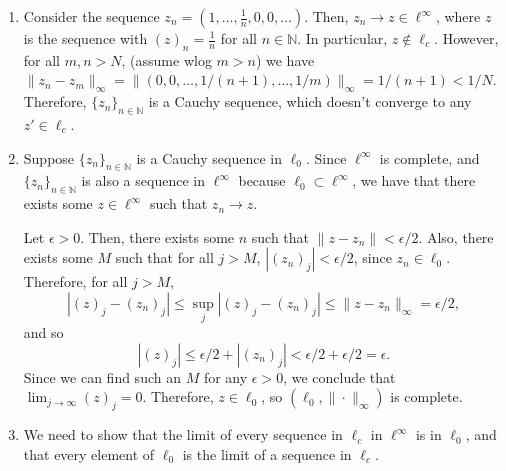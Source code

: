 \documentclass[11pt]{article}
\newcommand{\C}{\mathbb{C}}
\newcommand{\N}{\mathbb{N}}
\begin{document}
\begin{enumerate}[label=\arabic*., leftmargin=*, itemsep=10pt]
\begin{enumerate}
        Let $z \in \ell^{\infty}$, and let $\lambda \in \C$.
        Now, for each index $j$, we have $(\lambda z)_j = \lambda (z)_j$.
        Then,
        \[
        \|\lambda z\|_{\infty} = \sup_{j}|(\lambda z)_j| = \sup_{j} |\lambda (z)_j| = \sup_{j} |\lambda| |(z)_j| = |\lambda| \sup_j |(z)_j| = |\lambda| \|z\|_{\infty}
        .\] 
        Finally, we prove the triangle inequality. Let $y, z \in \ell^{\infty}$ We have that:
        \[
            \|y + z\| = \sup_{j} |(y + z)_j| \leq \sup_{j} (|(y)_j| + |(z)_j|) \leq \sup_{j} |(y)_j| + \sup_{k} |(z)_k| = \|y\|_{\infty} + \|z\|_{\infty}
        .\] 
        Therefore, $\|\cdot \|_{\infty}$ is a norm over $\ell^{\infty}$.
    \item Consider the sequence $z_n = (1, \ldots, \frac{1}{n}, 0, 0, \ldots)$.
        Then, $z_n \to z \in \ell^{\infty}$, where $z$ is the sequence with $(z)_n = \frac{1}{n}$ for all $n \in \N$.
        In particular, $z \not\in \ell_{c}$.
        However, for all $m, n > N$, (assume wlog $m > n$) we have $\|z_n - z_m\|_{\infty} = \|(0, 0, \ldots, 1 / (n + 1), \ldots, 1 / m)\|_{\infty} = 1 /(n + 1) < 1 / N$.
        Therefore, $\{z_n\}_{n \in \N} $ is a Cauchy sequence, which doesn't converge to any $z' \in \ell_{c}$.
    \item Suppose $\{z_n\}_{n \in \N} $ is a Cauchy sequence in $\ell_{0}$.
        Since $\ell^{\infty}$ is complete, and $\{z_n\}_{n \in \N} $ is also a sequence in $\ell^{\infty}$ because $\ell_{0} \subset  \ell^{\infty}$, we have that there exists some $z \in \ell^{\infty}$ such that $z_n \to z$.


        Let $\epsilon > 0$.
        Then, there exists some $n$ such that $\|z - z_n\| < \epsilon / 2$.
        Also, there exists some $M$ such that for all $j > M$, $|(z_n)_j| < \epsilon / 2$, since $z_n \in \ell_{0}$.
        Therefore, for all $j > M$,
        \[
        |(z)_j - (z_n)_j| \leq \sup_{j}|(z)_j - (z_n)_j| \leq \|z - z_n\|_{\infty} = \epsilon / 2
        ,\] 
        and so
        \[
            |(z)_j| \leq \epsilon / 2 + |(z_n)_j| < \epsilon / 2 + \epsilon / 2 = \epsilon
        .\] 
        Since we can find such an $M$ for any $\epsilon > 0$, we conclude that $\lim_{j \to \infty} (z)_j = 0$.
        Therefore, $z \in \ell_{0}$, so $(\ell_0, \| \cdot \|_{\infty})$ is complete.

    \item We need to show that the limit of every sequence in $\ell_{c}$ in $\ell^{\infty}$ is in $\ell_{0}$, and that every element of $\ell_{0}$ is the limit of a sequence in $\ell_{c}$.


\end{enumerate}
\end{enumerate}
\end{document}
